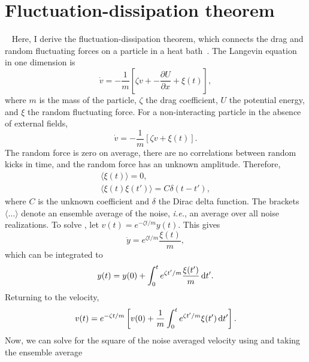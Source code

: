 \chapter{Fluctuation-dissipation theorem}~\label{appx:fluct_dissipation}
Here, I derive the fluctuation-dissipation theorem, which connects the drag and
random fluctuating forces on a particle in a heat
bath~\cite{zwanzig_nonequilibrium_01}. The Langevin equation in one dimension is
%
\begin{equation}
   \dot{v} = 
    -\frac{1}{m} 
    \left[ \zeta v + -\frac{\partial U}{\partial x} + \xi(t) \right],
\end{equation}
%
where $m$ is the mass of the particle, $\zeta$ the drag coefficient, $U$ the
potential energy, and $\xi$ the random fluctuating force.  For a non-interacting
particle in the absence of external fields,
%
\begin{equation}
  \label{eqn:v_dot}
   \dot{v} = 
    -\frac{1}{m} \left[ \zeta v + \xi(t) \right].
\end{equation}
%
The random force is zero on average, there are no
correlations between random kicks in time,
and the random force has an unknown amplitude.  Therefore,
\begin{gather}
  \langle \xi( t ) \rangle = 0,\\
  \langle \xi( t ) \xi( t') \rangle = C \delta(t-t'),
\end{gather}
%
where $C$ is the unknown coefficient and $\delta$ the Dirac delta function.  The
brackets $\langle \ldots \rangle$ denote an ensemble average of the
noise, \textit{i.e.}, an average over all noise realizations.  To solve
, let $ v(t) = e^{ -\zeta t / m } y(t) $.  This gives
% 
\begin{equation}
   \dot{y} = e^{\zeta t  / m} \frac{\xi(t)}{m},
\end{equation}
%
which can be integrated to
% 
\begin{equation}
   y(t) = y(0) + \int_0^t e^{\zeta t'  / m} \frac{\xi(t')}{m} \mathop{}\!\mathrm{d} t'.
\end{equation}
%
Returning to the velocity, 
% 
\begin{equation}
   v(t) = e^{-\zeta t  / m} \left[ v(0) 
    + \frac{1}{m}\int_0^t e^{\zeta t'/ m}\xi(t') \mathop{}\!\mathrm{d} t' \right].
  \label{eqn:langevin_velocity}
\end{equation}
%
Now, we can solve for the square of the noise averaged velocity using
 and taking the ensemble average
% 
